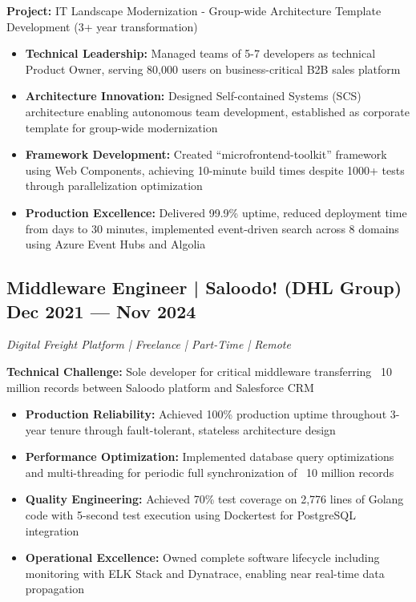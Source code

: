 \documentclass[10pt,a4paper]{article}
\begin{document}
\textbf{Project:} IT Landscape Modernization - Group-wide Architecture Template Development (3+ year transformation)
\begin{itemize}
\item \textbf{Technical Leadership:} Managed teams of 5-7 developers as technical Product Owner, serving 80,000 users on business-critical B2B sales platform
\item \textbf{Architecture Innovation:} Designed Self-contained Systems (SCS) architecture enabling autonomous team development, established as corporate template for group-wide modernization
\item \textbf{Framework Development:} Created ``microfrontend-toolkit'' framework using Web Components, achieving 10-minute build times despite 1000+ tests through parallelization optimization
\item \textbf{Production Excellence:} Delivered 99.9\% uptime, reduced deployment time from days to 30 minutes, implemented event-driven search across 8 domains using Azure Event Hubs and Algolia
\end{itemize}

\vspace{4pt}

\subsection{Middleware Engineer | Saloodo! (DHL Group) \hfill Dec 2021 --- Nov 2024}
\textit{Digital Freight Platform | Freelance | Part-Time | Remote}

\textbf{Technical Challenge:} Sole developer for critical middleware transferring ~10 million records between Saloodo platform and Salesforce CRM
\begin{itemize}
\item \textbf{Production Reliability:} Achieved 100\% production uptime throughout 3-year tenure through fault-tolerant, stateless architecture design
\item \textbf{Performance Optimization:} Implemented database query optimizations and multi-threading for periodic full synchronization of ~10 million records
\item \textbf{Quality Engineering:} Achieved 70\% test coverage on 2,776 lines of Golang code with 5-second test execution using Dockertest for PostgreSQL integration
\item \textbf{Operational Excellence:} Owned complete software lifecycle including monitoring with ELK Stack and Dynatrace, enabling near real-time data propagation
\end{itemize}
\end{document}
